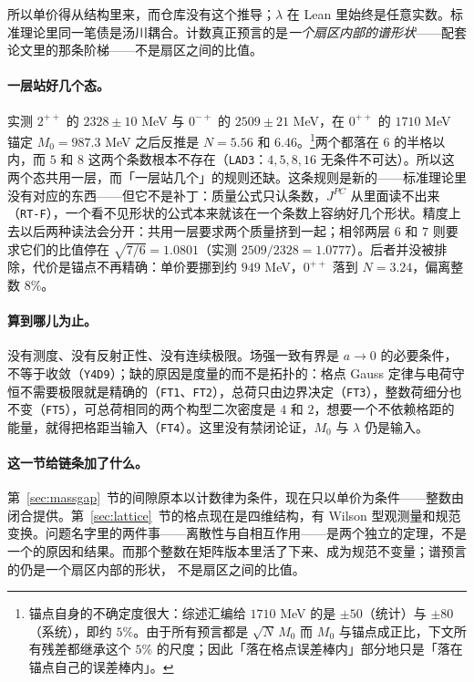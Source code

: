 \documentclass[aps,prd,preprint,superscriptaddress,amsmath,amssymb]{revtex4-2}
\begin{document}
所以单价得从结构里来，而仓库没有这个推导；$\lambda$ 在 Lean 里始终是任意实数。标准理论里同一笔债是汤川耦合。计数真正预言的是\emph{一个扇区内部的谱形状}——配套论文里的那条阶梯——不是扇区之间的比值。

\paragraph{一层站好几个态。}
实测 $2^{++}$ 的 $2328\pm10$ MeV 与 $0^{-+}$ 的 $2509\pm21$ MeV，在 $0^{++}$ 的 $1710$ MeV 锚定 $M_0=987.3$ MeV 之后反推是 $N=5.56$ 和 $6.46$。\footnote{锚点自身的不确定度很大：综述汇编给 $1710$ MeV 的是 $\pm50$（统计）与 $\pm80$（系统），即约 $5\%$。由于所有预言都是 $\sqrt N\,M_0$ 而 $M_0$ 与锚点成正比，下文所有残差都继承这个 $5\%$ 的尺度；因此「落在格点误差棒内」部分地只是「落在锚点自己的误差棒内」。}两个都落在 $6$ 的半格以内，而 $5$ 和 $8$ 这两个条数根本不存在（\texttt{LAD3}：$4,5,8,16$ 无条件不可达）。所以这两个态共用一层，而「一层站几个」的规则还缺。这条规则是新的——标准理论里没有对应的东西——但它不是补丁：质量公式只认条数，$J^{PC}$ 从里面读不出来（\texttt{RT-F}），一个看不见形状的公式本来就该在一个条数上容纳好几个形状。精度上去以后两种读法会分开：共用一层要求两个质量挤到一起；相邻两层 $6$ 和 $7$ 则要求它们的比值停在 $\sqrt{7/6}=1.0801$（实测 $2509/2328=1.0777$）。后者并没被排除，代价是锚点不再精确：单价要挪到约 $949$ MeV，$0^{++}$ 落到 $N=3.24$，偏离整数 $8\%$。

\paragraph{算到哪儿为止。}
没有测度、没有反射正性、没有连续极限。场强一致有界是 $a\to0$ 的必要条件，不等于收敛（\texttt{Y4D9}）；缺的原因是度量的而不是拓扑的：格点 Gauss 定律与电荷守恒不需要极限就是精确的（\texttt{FT1}、\texttt{FT2}），总荷只由边界决定（\texttt{FT3}），整数荷细分也不变（\texttt{FT5}），可总荷相同的两个构型二次密度是 $4$ 和 $2$，想要一个不依赖格距的能量，就得把格距当输入（\texttt{FT4}）。这里没有禁闭论证，$M_0$ 与 $\lambda$ 仍是输入。

\paragraph{这一节给链条加了什么。}
第~\ref{sec:massgap}~节的间隙原本以计数律为条件，现在只以单价为条件——整数由闭合提供。第~\ref{sec:lattice}~节的格点现在是四维结构，有 Wilson 型观测量和规范变换。问题名字里的两件事——离散性与自相互作用——是两个独立的定理，不是一个的原因和结果。而那个整数在矩阵版本里活了下来、成为规范不变量；谱预言的仍是一个扇区内部的形状，
不是扇区之间的比值。
\end{document}
